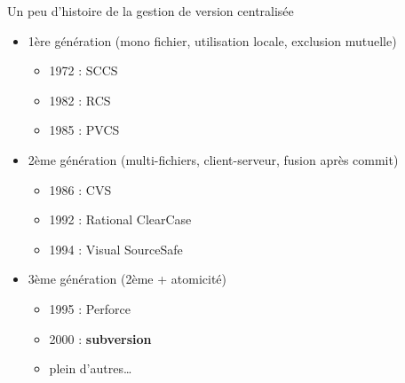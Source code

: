 \begin{frame}{%
\protect\hypertarget{un-peu-dhistoire-de-la-gestion-de-version-centralisuxe9e}{%
Un peu d’histoire de la gestion de version centralisée}}

\begin{itemize}
\tightlist
\item
  1ère génération (mono fichier, utilisation locale, exclusion mutuelle)

  \begin{itemize}
  \tightlist
  \item
    1972 : SCCS
  \item
    1982 : RCS
  \item
    1985 : PVCS
  \end{itemize}
\item
  2ème génération (multi-fichiers, client-serveur, fusion après commit)

  \begin{itemize}
  \tightlist
  \item
    1986 : CVS
  \item
    1992 : Rational ClearCase
  \item
    1994 : Visual SourceSafe
  \end{itemize}
\item
  3ème génération (2ème + atomicité)

  \begin{itemize}
  \tightlist
  \item
    1995 : Perforce
  \item
    2000 : \textbf{subversion}
  \item
    plein d’autres\ldots{}
  \end{itemize}
\end{itemize}

\end{frame}

